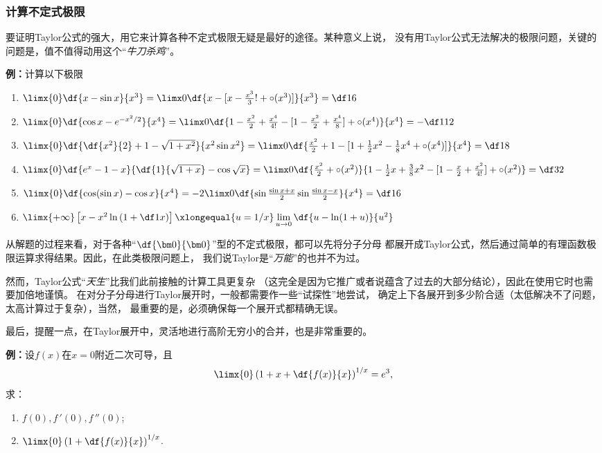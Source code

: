 \subsubsection{计算不定式极限}

要证明Taylor公式的强大，用它来计算各种不定式极限无疑是最好的途径。某种意义上说，
没有用Taylor公式无法解决的极限问题，关键的问题是，值不值得动用这个“{\it 牛刀杀鸡}”。

{\bf 例：}计算以下极限
\begin{enumerate}[(1)]
  \setlength{\itemindent}{1cm}
  \item $\limx{0}\df{x-\sin x}{x^3}
  =\limx0\df{x-[x-\frac{x^3}3!+\circ(x^3)]}{x^3}=\df16$
  \item $\limx{0}\df{\cos x-e^{-x^2/2}}{x^4}
  =\limx0\df{1-\frac{x^2}2+\frac{x^4}{4!}-[1-\frac{x^2}2+
  \frac{x^4}8]+\circ(x^4)}{x^4}=-\df1{12}$ 
  \item $\limx{0}\df{\df{x^2}{2}+1-\sqrt{1+x^2}}{x^2\sin x^2}
  =\limx0\df{\frac{x^2}2+1-[1+\frac12{x^2}-\frac18x^4+\circ(x^4)]}{x^4}
  =\df18$ 
  \item $\limx{0}\df{e^x-1-x}{\df{1}{\sqrt{1+x}}-\cos\sqrt x}
  =\limx0\df{\frac{x^2}2+\circ(x^2)}{1-\frac12x+\frac38x^2-[1-\frac{x}2+\frac{x^2}{4!}]+\circ(x^2)}
  =\df32$ 
  \item $\limx{0}\df{\cos(\sin x)-\cos x}{x^4}
  =-2\limx0\df{\sin\frac{\sin x+x}2\sin\frac{\sin x-x}2}{x^4}=\df16$
  \item $\limx{+\infty}\left[x-x^2\ln\left(1+\df 1x\right)\right]
  \xlongequal{u=1/x}\lim\limits_{u\to0}\df{u-\ln(1+u)}{u^2}$
\end{enumerate}

从解题的过程来看，对于各种“$\df{\bm0}{\bm0}$”型的不定式极限，都可以先将分子分母
都展开成Taylor公式，然后通过简单的有理函数极限运算求得结果。因此，在此类极限问题上，
我们说Taylor是“{\it 万能}”的也并不为过。

然而，Taylor公式“{\it 天生}”比我们此前接触的计算工具更复杂
（这完全是因为它推广或者说蕴含了过去的大部分结论），因此在使用它时也需要加倍地谨慎。
在对分子分母进行Taylor展开时，一般都需要作一些“试探性”地尝试，
确定上下各展开到多少阶合适（太低解决不了问题，太高计算过于复杂），当然，
最重要的是，必须确保每一个展开式都精确无误。

最后，提醒一点，在Taylor展开中，灵活地进行高阶无穷小的合并，也是非常重要的。

{\bf 例：}设$f(x)$在$x=0$附近二次可导，且
$$\limx{0}\left(1+x+\df{f(x)}{x}\right)^{1/x}=e^3,$$
求：
\begin{enumerate}[(1)]
  \setlength{\itemindent}{1cm}
  \item $f(0),f\,'(0),f\,''(0)$;
  \item $\limx{0}\left(1+\df{f(x)}{x}\right)^{1/x}$.
\end{enumerate}


